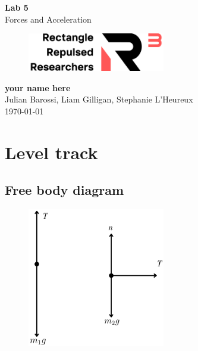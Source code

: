 \documentclass[11pt, letterpaper, includehead]{article}
\begin{document}
\begin{titlepage}
  \begin{center}
    \Huge{\textbf{Lab 5}}\\
    \Huge{Forces and Acceleration}
    \vfill
    \begin{figure}[H] %
      \centering 
      \includegraphics[width=6cm]{../logo.png}
    \end{figure}
    \large{\textbf{your name here}}\\
    \large{Julian Barossi, Liam Gilligan, Stephanie L'Heureux}\\
    \vspace{0.5cm}
    \normalsize
    \today
  \end{center}
\end{titlepage}

\tableofcontents
\pagebreak %

\pagestyle{fancy}
\fancyhead{}

\section{Level track} %

\subsection{Free body diagram} %
\begin{figure}[H] %
  \centering 
  \includegraphics[width=6cm]{part_1.png}
\end{figure}
\end{document}
